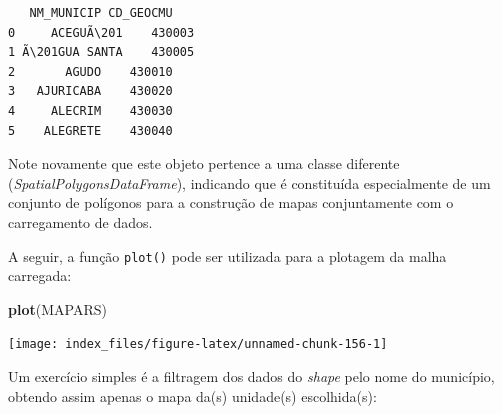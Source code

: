 \documentclass[12pt,brazil,oneside]{book}
\newenvironment{Shaded}{\begin{snugshade}}{\end{snugshade}}
\newcommand{\CommentTok}[1]{\textcolor[rgb]{0.56,0.35,0.01}{\textit{#1}}}
\newcommand{\DataTypeTok}[1]{\textcolor[rgb]{0.13,0.29,0.53}{#1}}
\newcommand{\DecValTok}[1]{\textcolor[rgb]{0.00,0.00,0.81}{#1}}
\newcommand{\FloatTok}[1]{\textcolor[rgb]{0.00,0.00,0.81}{#1}}
\newcommand{\KeywordTok}[1]{\textcolor[rgb]{0.13,0.29,0.53}{\textbf{#1}}}
\newcommand{\NormalTok}[1]{#1}
\newcommand{\OperatorTok}[1]{\textcolor[rgb]{0.81,0.36,0.00}{\textbf{#1}}}
\newcommand{\StringTok}[1]{\textcolor[rgb]{0.31,0.60,0.02}{#1}}
\begin{document}
\begin{Shaded}
\end{Shaded}

\begin{verbatim}
   NM_MUNICIP CD_GEOCMU
0     ACEGUÃ\201    430003
1 Ã\201GUA SANTA    430005
2       AGUDO    430010
3   AJURICABA    430020
4     ALECRIM    430030
5    ALEGRETE    430040
\end{verbatim}

Note novamente que este objeto pertence a uma classe diferente (\emph{SpatialPolygonsDataFrame}), indicando que é constituída especialmente de um conjunto de polígonos para a construção de mapas conjuntamente com o carregamento de dados.

A seguir, a função \texttt{plot()} pode ser utilizada para a plotagem da malha carregada:

\begin{Shaded}
\begin{Highlighting}[]
\KeywordTok{plot}\NormalTok{(MAPARS)}
\end{Highlighting}
\end{Shaded}

\begin{center}\texttt{[image: index\_files/figure-latex/unnamed-chunk-156-1]} \end{center}

Um exercício simples é a filtragem dos dados do \emph{shape} pelo nome do município, obtendo assim apenas o mapa da(s) unidade(s) escolhida(s):

\begin{Shaded}
\end{Shaded}
\end{document}
